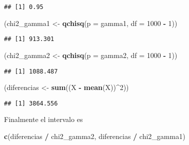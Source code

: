 \documentclass[
  12pt,
]{book}
\newenvironment{Shaded}{\begin{snugshade}}{\end{snugshade}}
\newcommand{\DataTypeTok}[1]{\textcolor[rgb]{0.13,0.29,0.53}{#1}}
\newcommand{\DecValTok}[1]{\textcolor[rgb]{0.00,0.00,0.81}{#1}}
\newcommand{\KeywordTok}[1]{\textcolor[rgb]{0.13,0.29,0.53}{\textbf{#1}}}
\newcommand{\NormalTok}[1]{#1}
\newcommand{\OperatorTok}[1]{\textcolor[rgb]{0.81,0.36,0.00}{\textbf{#1}}}
\newcommand{\StringTok}[1]{\textcolor[rgb]{0.31,0.60,0.02}{#1}}
\begin{document}
\begin{verbatim}
## [1] 0.95
\end{verbatim}

\begin{Shaded}
\begin{Highlighting}[]
\NormalTok{(chi2\_gamma1 \textless{}{-}}\StringTok{ }\KeywordTok{qchisq}\NormalTok{(}\DataTypeTok{p =}\NormalTok{ gamma1, }\DataTypeTok{df =} \DecValTok{1000} \OperatorTok{{-}}\StringTok{ }\DecValTok{1}\NormalTok{))}
\end{Highlighting}
\end{Shaded}

\begin{verbatim}
## [1] 913.301
\end{verbatim}

\begin{Shaded}
\begin{Highlighting}[]
\NormalTok{(chi2\_gamma2 \textless{}{-}}\StringTok{ }\KeywordTok{qchisq}\NormalTok{(}\DataTypeTok{p =}\NormalTok{ gamma2, }\DataTypeTok{df =} \DecValTok{1000} \OperatorTok{{-}}\StringTok{ }\DecValTok{1}\NormalTok{))}
\end{Highlighting}
\end{Shaded}

\begin{verbatim}
## [1] 1088.487
\end{verbatim}

\begin{Shaded}
\begin{Highlighting}[]
\NormalTok{(diferencias \textless{}{-}}\StringTok{ }\KeywordTok{sum}\NormalTok{((X }\OperatorTok{{-}}\StringTok{ }\KeywordTok{mean}\NormalTok{(X))}\OperatorTok{\^{}}\DecValTok{2}\NormalTok{))}
\end{Highlighting}
\end{Shaded}

\begin{verbatim}
## [1] 3864.556
\end{verbatim}

Finalmente el intervalo es

\begin{Shaded}
\begin{Highlighting}[]
\KeywordTok{c}\NormalTok{(diferencias }\OperatorTok{/}\StringTok{ }\NormalTok{chi2\_gamma2, diferencias }\OperatorTok{/}\StringTok{ }\NormalTok{chi2\_gamma1)}
\end{Highlighting}
\end{Shaded}
\end{document}
